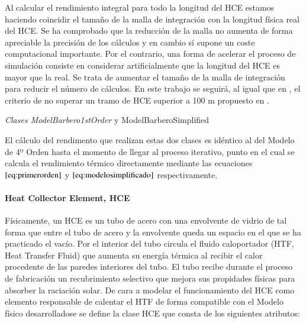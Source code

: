 Al calcular el rendimiento integral para todo la longitud del HCE estamos haciendo coincidir el tamaño de la malla de integración con la longitud física real del HCE. Se ha comprobado que la reducción de la malla no aumenta de forma apreciable la precisión de los cálculos y en cambio sí supone un coste computacional importante. Por el contrario, una forma de acelerar el proceso de simulación consiste en considerar artificialmente que la longitud del HCE es mayor que la real. Se trata de aumentar el tamaño de la malla de integración para reducir el número de cálculos. En este trabajo se seguirá, al igual que en \cite{1022085/7TD8VTGL}, el criterio de no superar un tramo de HCE superior a 100 m propuesto en \cite{1022085/CYH3NJEG}. 

\emph{Clases ModelBarbero1stOrder} y ModelBarberoSimplified

El cálculo del rendimento que realizan estas dos clases es idéntico al del Modelo de 4º Orden hasta el momento de llegar al proceso iterativo, punto en el cual se calcula el rendimiento térmico directamente mediante las ecuaciones  \(\eqref{eq:primerorden}\) y \(\eqref{eq:modelosimplificado}\) respectivamente.

\hypertarget{heat-collector-element-hce}{\paragraph{Heat Collector Element, HCE}\label{heat-collector-element-hce}}

Físicamente, un HCE es un tubo de acero con una envolvente de vidrio de tal forma que entre el tubo de acero y la envolvente queda un espacio en el que se ha practicado el vacío. Por el interior del tubo circula el fluido caloportador (HTF, Heat Transfer Fluid) que aumenta su energía térmica al recibir el calor procedente de las paredes interiores del tubo. El tubo recibe durante el proceso de fabricación un recubrimiento selectivo que mejora sus propidades físicas para absorber la raciación solar. De cara a modelar el funcionamiento del HCE como elemento responsable de calentar el HTF de forma compatible con el Modelo físico desarrolladose se define la clase HCE que consta de los siguientes atributos:

